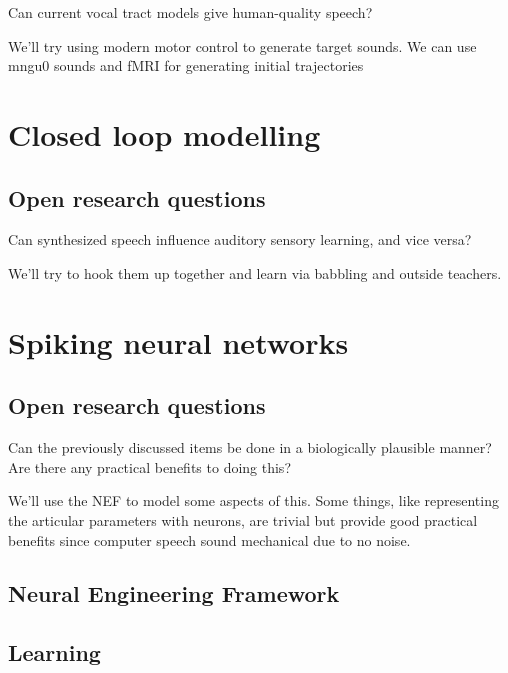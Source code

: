\documentclass{article}
\begin{document}
Can current vocal tract models give human-quality speech?

We'll try using modern motor control to generate target sounds.
We can use mngu0 sounds and fMRI for generating initial trajectories

\section{Closed loop modelling}

\subsection{Open research questions}

Can synthesized speech
influence auditory sensory learning,
and vice versa?

We'll try to hook them up together
and learn via babbling and outside teachers.

\section{Spiking neural networks}

\subsection{Open research questions}

Can the previously discussed items
be done in a biologically plausible manner?
Are there any practical benefits to doing this?

We'll use the NEF to model some aspects of this.
Some things,
like representing the articular parameters with neurons,
are trivial but provide good practical benefits
since computer speech sound mechanical due to no noise.

\subsection{Neural Engineering Framework}

\subsection{Learning}
\end{document}
